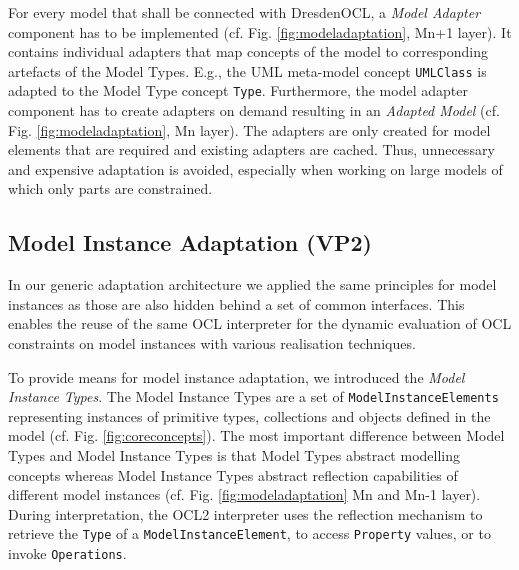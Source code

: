 	For every model that shall be connected with DresdenOCL, 
	a \emph{Model Adapter} component has to be implemented (cf. Fig. \ref{fig:modeladaptation}, Mn+1 layer). 
	It contains individual adapters that map concepts of the model to corresponding artefacts of the Model Types. E.g., the UML
	meta-model concept \texttt{UMLClass} is adapted to the Model Type concept
	\texttt{Type}. 
	Furthermore, the model adapter component has to create 
	adapters on demand resulting in an \textit{Adapted Model} (cf. Fig.
	\ref{fig:modeladaptation}, Mn layer).
	The adapters are only created for model elements that are required and
	existing adapters are cached. Thus, unnecessary and expensive adaptation is avoided, 
	especially when working on large models of which only parts are constrained.


\subsection{Model Instance Adaptation (VP2)}
	
	In our generic adaptation architecture we applied the same principles for model instances as those are also hidden behind a set of common
	interfaces. This enables the reuse of the same OCL interpreter for the dynamic
	evaluation of OCL constraints on model instances with various realisation techniques.
	
	To provide means for model instance adaptation, we introduced the
	\emph{Model Instance Types}. The Model Instance Types are a set of \texttt{ModelInstanceElements}
	representing instances of primitive types, 
	collections and objects defined in the model (cf. Fig. \ref{fig:coreconcepts}). 
  The most important difference between  Model Types and Model Instance Types
	is that Model Types abstract modelling concepts whereas Model Instance Types abstract 
	reflection capabilities of different model instances (cf. Fig. \ref{fig:modeladaptation} Mn and Mn-1 layer).
	During interpretation, the OCL2 interpreter uses the reflection mechanism to
	retrieve the \texttt{Type} of a \texttt{ModelInstanceElement}, to access \texttt{Property}
	values, or to invoke \texttt{Operations}.
	

